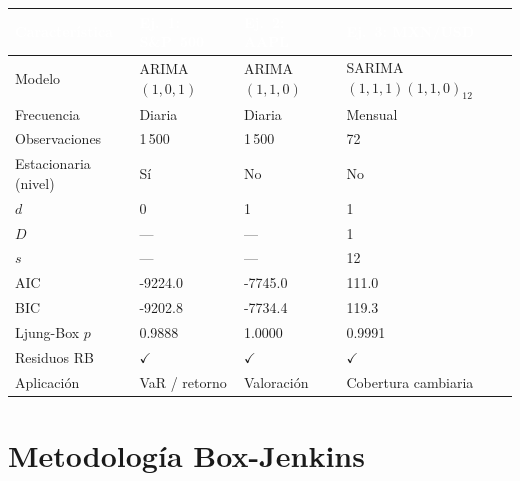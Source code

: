 \documentclass[12pt,letterpaper]{article}
\begin{document}
\begin{center}
\renewcommand{\arraystretch}{1.35}
\begin{tabular}{@{}L{3.2cm}L{2.5cm}L{2.5cm}L{2.5cm}@{}}
\toprule
{}\textcolor{white}{\textbf{Característica}} &
\textcolor{white}{\textbf{Ej.\ 1: S\&P~500}} &
\textcolor{white}{\textbf{Ej.\ 2: AAPL}} &
\textcolor{white}{\textbf{Ej.\ 3: MXN/USD}} \\
\midrule
{} Modelo & ARIMA$(1,0,1)$ & ARIMA$(1,1,0)$ & SARIMA$(1,1,1)(1,1,0)_{12}$ \\
Frecuencia & Diaria & Diaria & Mensual \\
 Observaciones & 1\,500 & 1\,500 & 72 \\
Estacionaria (nivel) & Sí & No & No \\
 $d$ & 0 & 1 & 1 \\
$D$ & --- & --- & 1 \\
 $s$ & --- & --- & 12 \\
AIC & -9224.0 & -7745.0 & 111.0 \\
 BIC & -9202.8 & -7734.4 & 119.3 \\
Ljung-Box $p$ & 0.9888 & 1.0000 & 0.9991 \\
 Residuos RB & $\checkmark$ & $\checkmark$ & $\checkmark$ \\
Aplicación & VaR / retorno & Valoración & Cobertura cambiaria \\
\bottomrule
\end{tabular}
\end{center}

\section{Metodología Box-Jenkins}
\end{document}

